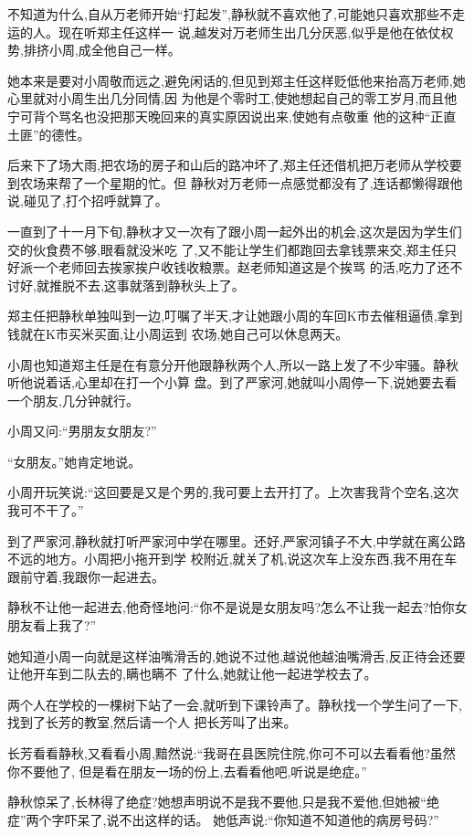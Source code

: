 ﻿\documentclass[12pt]{article}
\begin{document}
不知道为什么,自从万老师开始``打起发'',静秋就不喜欢他了,可能她只喜欢那些不走运的人。现在听郑主任这样一
说,越发对万老师生出几分厌恶,似乎是他在依仗权势,排挤小周,成全他自己一样。

她本来是要对小周敬而远之,避免闲话的,但见到郑主任这样贬低他来抬高万老师,她心里就对小周生出几分同情,因
为他是个零时工,使她想起自己的零工岁月,而且他宁可背个骂名也没把那天晚回来的真实原因说出来,使她有点敬重
他的这种``正直土匪''的德性。

后来下了场大雨,把农场的房子和山后的路冲坏了,郑主任还借机把万老师从学校要到农场来帮了一个星期的忙。但
静秋对万老师一点感觉都没有了,连话都懒得跟他说,碰见了,打个招呼就算了。


一直到了十一月下旬,静秋才又一次有了跟小周一起外出的机会,这次是因为学生们交的伙食费不够,眼看就没米吃
了,又不能让学生们都跑回去拿钱票来交,郑主任只好派一个老师回去挨家挨户收钱收粮票。赵老师知道这是个挨骂
的活,吃力了还不讨好,就推脱不去,这事就落到静秋头上了。

郑主任把静秋单独叫到一边,叮嘱了半天,才让她跟小周的车回K市去催租逼债,拿到钱就在K市买米买面,让小周运到
农场,她自己可以休息两天。

小周也知道郑主任是在有意分开他跟静秋两个人,所以一路上发了不少牢骚。静秋听他说着话,心里却在打一个小算
盘。到了严家河,她就叫小周停一下,说她要去看一个朋友,几分钟就行。

小周又问:``男朋友女朋友?''

``女朋友。''她肯定地说。

小周开玩笑说:``这回要是又是个男的,我可要上去开打了。上次害我背个空名,这次我可不干了。''

到了严家河,静秋就打听严家河中学在哪里。还好,严家河镇子不大,中学就在离公路不远的地方。小周把小拖开到学
校附近,就关了机,说这次车上没东西,我不用在车跟前守着,我跟你一起进去。

静秋不让他一起进去,他奇怪地问:``你不是说是女朋友吗?怎么不让我一起去?怕你女朋友看上我了?''

她知道小周一向就是这样油嘴滑舌的,她说不过他,越说他越油嘴滑舌,反正待会还要让他开车到二队去的,瞒也瞒不
了什么,她就让他一起进学校去了。

两个人在学校的一棵树下站了一会,就听到下课铃声了。静秋找一个学生问了一下,找到了长芳的教室,然后请一个人
把长芳叫了出来。

长芳看看静秋,又看看小周,黯然说:``我哥在县医院住院,你\myrule 可不可以去看看他?虽然你\myrule 不要他了,
但是\myrule 看在\myrule 朋友一场的份上,去看看他吧,听说是\myrule 绝症。''

静秋惊呆了,长林得了绝症?她想声明说不是我不要他,只是我不爱他,但她被``绝症''两个字吓呆了,说不出这样的话。
她低声说:``你知道不知道他的病房号码?''
\end{document}
